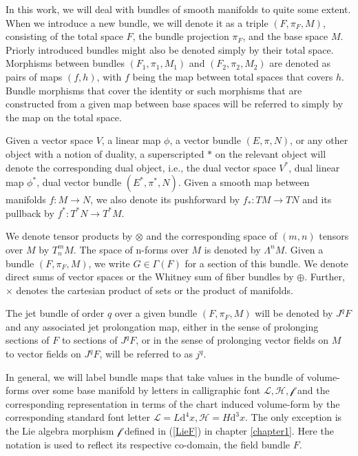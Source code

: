 In this work, we will deal with bundles of smooth manifolds to quite some extent. When we introduce a new bundle, we will denote it as a triple $(F,\pi_F,M)$, consisting of the total space $F$, the bundle projection $\pi_F$, and the base space $M$. Priorly introduced bundles might also be denoted simply by their total space. Morphisms between bundles $(F_1,\pi_1,M_1)$ and $(F_2,\pi_2,M_2)$ are denoted as pairs of maps $(f,h)$, with $f$ being the map between total spaces that covers $h$. Bundle morphisms that cover the identity or such morphisms that are constructed from a given map between base spaces will be referred to simply by the map on the total space.

Given a vector space $V$, a linear map $\phi$, a vector bundle $(E,\pi,N)$, or any other object with a notion of duality, a superscripted $\ast$ on the relevant object will denote the corresponding dual object, i.e., the dual vector space $V^{\ast}$, dual linear map $\phi^{\ast}$, dual vector bundle $(E^{\ast}, \pi^{\ast},N)$. Given a smooth map between manifolds $f : M \rightarrow N$, we also denote its pushforward by $f_{\ast} : TM \rightarrow TN$ and its pullback by $f^{\ast} : T^{\ast}N \rightarrow T^{\ast}M$.

We denote tensor products by $\otimes$ and the corresponding space of $(m,n)$ tensors over $M$ by $T^m_nM$. The space of n-forms over $M$ is denoted by $\Lambda^nM$. Given a bundle $(F,\pi_{F},M)$, we write $G \in \Gamma(F) $ for a section of this bundle. We denote direct sums of vector spaces or the Whitney sum of fiber bundles by $\oplus$. Further, $\times$ denotes the cartesian product of sets or the product of manifolds.

The jet bundle of order $q$ over a given bundle $(F,\pi_F,M)$ will be denoted by $J^qF$ and any associated jet prolongation map, either in the sense of prolonging sections of $F$ to sections of $J^qF$, or in the sense of prolonging vector fields on $M$ to vector fields on $J^qF$, will be referred to as $j^q$. 

In general, we will label bundle maps that take values in the bundle of volume-forms over some base manifold by letters in calligraphic font $\mathcal{L}, \mathcal{H}, \mathcal{f}$ and the corresponding representation in terms of the chart induced volume-form by the corresponding standard font letter $\mathcal{L}=L \mathrm{d}^4x, \mathcal{H}= H \mathrm{d}^3x$. The only exception is the Lie algebra morphism $\mathcal{f}$ defined in (\ref{LieF}) in chapter \ref{chapter1}. Here the notation is used to reflect its respective co-domain, the field bundle $F$. 

